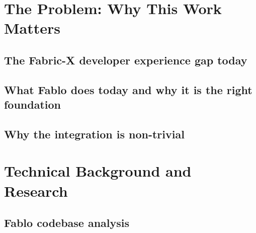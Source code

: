 \section{The Problem: Why This Work Matters}

\subsection{The Fabric-X developer experience gap today}
 
\subsection{What Fablo does today and why it is the right foundation}
 
\subsection{Why the integration is non-trivial}

 
\section{Technical Background and Research}

\subsection{Fablo codebase analysis}

